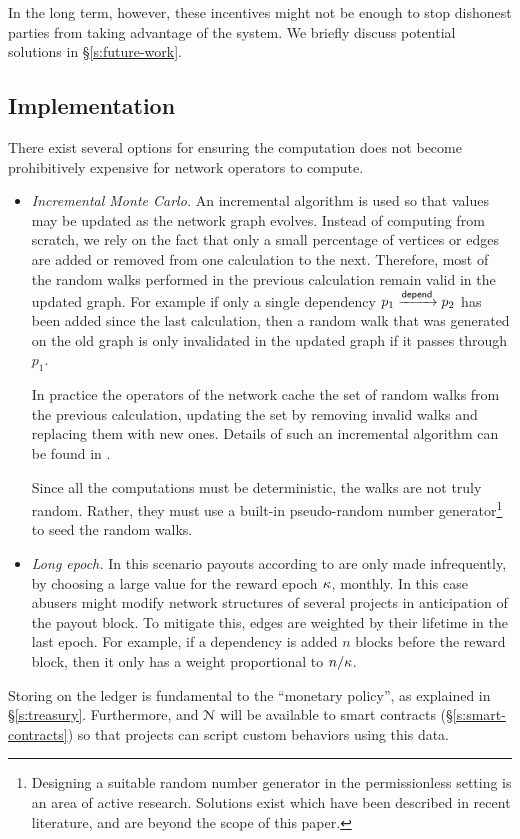 In the long term, however, these incentives might not be enough to stop dishonest
parties from taking advantage of the system. We briefly discuss potential
solutions in \S\ref{s:future-work}.

\subsection{Implementation}

There exist several options for ensuring the \osrank{} computation
does not become prohibitively expensive for network operators to compute.

\begin{itemize}
\item \emph{Incremental Monte Carlo.} An incremental algorithm is used so that
  \osrank{} values may be updated as the network graph evolves. Instead of
  computing \osrank{} from scratch, we rely on the fact that only a small
  percentage of vertices or edges are added or removed
  from one calculation to the next. Therefore, most of the random walks
  performed in the previous calculation remain valid in the updated graph. For
  example if only a single dependency $p_1 \xrightarrow[]{\mathsf{depend}} p_2$ has been
  added since the last calculation, then a random walk that was generated on the
  old graph is only invalidated in the updated graph if it passes through $p_1$.

  In practice the operators of the network cache the set of random
  walks from the previous calculation, updating the set by removing
  invalid walks and replacing them with new ones. Details of such an
  incremental \pagerank{} algorithm can be found
  in \cite{incr pagerank}.

  Since all the computations must be deterministic, the walks are not truly
  random. Rather, they must use a built-in pseudo-random number
  generator\footnote{Designing a suitable random number generator in the
  permissionless setting is an area of active research. Solutions exist
  which have been described in recent literature, and are beyond the
  scope of this paper.} to seed the random walks.

\item \emph{Long epoch.} In this scenario payouts according to
  \osrank{} are only made infrequently, by choosing a large value for the
  reward epoch $\kappa$, \eg{} monthly.  In this case
  abusers might modify network structures of several projects in
  anticipation of the payout block. To mitigate this, edges are
  weighted by their lifetime in the last epoch. For
  example, if a dependency is added $n$ blocks before the reward block,
  then it only has a weight proportional to $n/\kappa$.
\end{itemize}

\bigskip

\noindent Storing \osrank{} on the ledger is fundamental to the \oscoin{}
``monetary policy'', as explained in \S \ref{s:treasury}. Furthermore,
\osrank{} and $\mathcal{N}$ will be available to smart contracts
(\S\ref{s:smart-contracts}) so that projects can script custom behaviors using
this data.
